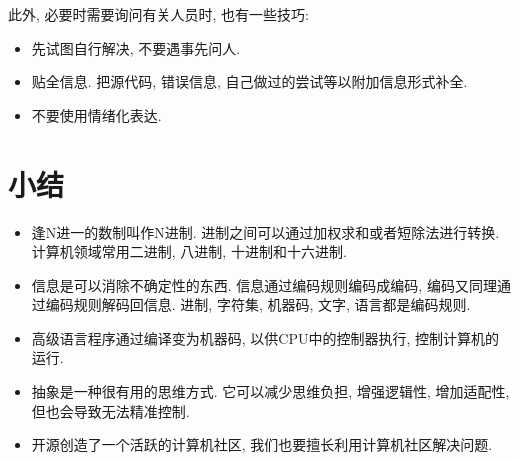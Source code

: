         此外, 必要时需要询问有关人员时, 也有一些技巧:
        \vspace*{-13pt}
        \begin{itemize}
            \item 先试图自行解决, 不要遇事先问人.
            \item 贴全信息. 把源代码, 错误信息, 自己做过的尝试等以附加信息形式补全.
            \item 不要使用情绪化表达. 
        \end{itemize}

    \sumrule
    \section*{小结}
        \begin{itemize}
            \item 逢N进一的数制叫作N进制. 进制之间可以通过加权求和或者短除法进行转换. 计算机领域常用二进制, 八进制, 十进制和十六进制.
            \item 信息是可以消除不确定性的东西. 信息通过编码规则编码成编码, 编码又同理通过编码规则解码回信息. 进制, 字符集, 机器码, 文字, 语言都是编码规则.
            \item 高级语言程序通过编译变为机器码, 以供CPU中的控制器执行, 控制计算机的运行.
            \item 抽象是一种很有用的思维方式. 它可以减少思维负担, 增强逻辑性, 增加适配性, 但也会导致无法精准控制.
            \item 开源创造了一个活跃的计算机社区, 我们也要擅长利用计算机社区解决问题.
        \end{itemize}
